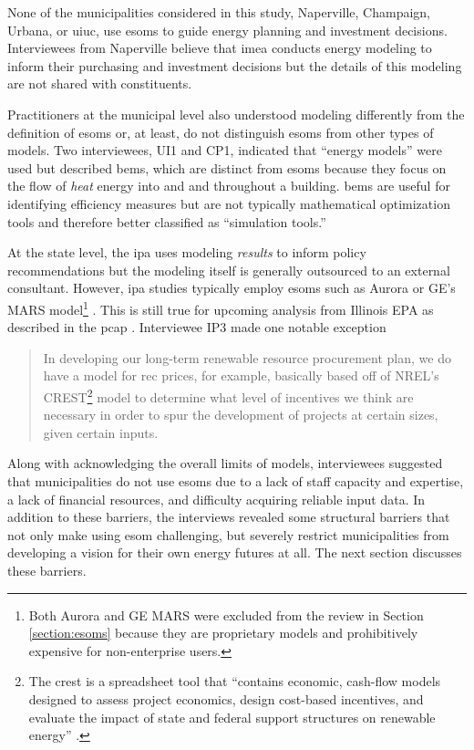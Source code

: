None of the municipalities considered in this study, Naperville, Champaign,
Urbana, or \ac{uiuc}, use \acp{esom} to guide energy planning and investment
decisions. Interviewees from Naperville believe that \ac{imea} conducts energy
modeling to inform their purchasing and investment decisions but the details of
this modeling are not shared with constituents.

Practitioners at the municipal level also understood modeling differently from
the definition of \acp{esom} or, at least, do not distinguish \acp{esom} from
other types of models. Two interviewees, UI1 and CP1, indicated that ``energy
models'' were used but described \acp{bem}, which are distinct from \acp{esom}
because they focus on the flow of \textit{heat} energy into and and throughout a
building. \acp{bem} are useful for identifying efficiency measures but are not
typically mathematical optimization tools and therefore better classified as
``simulation tools.''

At the state level, the \ac{ipa} uses modeling \textit{results} to inform policy
recommendations but the modeling itself is generally outsourced to an external
consultant. However, \ac{ipa} studies typically employ \acp{esom} such as Aurora
or GE's MARS model\footnote{Both Aurora and GE MARS were excluded from the
review in Section \ref{section:esoms} because they are proprietary models and
prohibitively expensive for non-enterprise users.}
\cite{bringolf_evaluation_2024, carlson_illinois_2024}. This is still true for
upcoming analysis from Illinois EPA as described in the \ac{pcap}
\cite{kibbey_state_2024}. Interviewee IP3 made one notable exception 
\begin{quote}
    In developing our long-term renewable resource procurement plan, we do have
    a model for \ac{rec} prices, for example, basically based off of NREL's
    CREST\footnote{The \ac{crest} is a spreadsheet tool that ``contains
    economic, cash-flow models designed to assess project economics, design
    cost-based incentives, and evaluate the impact of state and federal support
    structures on renewable energy'' \cite{gifford_renewable_2011}. } model to
    determine what level of incentives we think are necessary in order to spur
    the development of projects at certain sizes, given certain inputs.
\end{quote}

Along with acknowledging the overall limits of models, interviewees suggested
that municipalities do not use \acp{esom} due to a lack of staff capacity and
expertise, a lack of financial resources, and difficulty acquiring reliable
input data. In addition to these barriers, the interviews revealed some
structural barriers that not only make using \ac{esom} challenging, but severely
restrict municipalities from developing a vision for their own energy futures at
all. The next section discusses these barriers.

